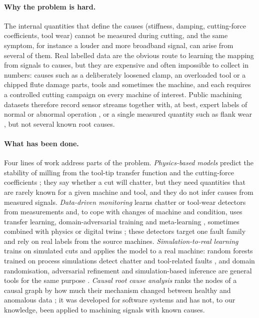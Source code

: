 \documentclass[11pt]{article}
\begin{document}
\paragraph{Why the problem is hard.}
The internal quantities that define the causes (stiffness, damping, cutting-force coefficients, tool wear) cannot be measured during cutting, and the same symptom, for instance a louder and more broadband signal, can arise from several of them.
Real labelled data are the obvious route to learning the mapping from signals to causes, but they are expensive and often impossible to collect in numbers: causes such as a deliberately loosened clamp, an overloaded tool or a chipped flute damage parts, tools and sometimes the machine, and each requires a controlled cutting campaign on every machine of interest.
Public machining datasets therefore record sensor streams together with, at best, expert labels of normal or abnormal operation \citep{kim2026msm}, or a single measured quantity such as flank wear \citep{denkena2023luh}, but not several known root causes.

\paragraph{What has been done.}
Four lines of work address parts of the problem.
\emph{Physics-based models} predict the stability of milling from the tool-tip transfer function and the cutting-force coefficients \citep{altintas2020}; they say whether a cut will chatter, but they need quantities that are rarely known for a given machine and tool, and they do not infer causes from measured signals.
\emph{Data-driven monitoring} learns chatter or tool-wear detectors from measurements and, to cope with changes of machine and condition, uses transfer learning, domain-adversarial training and meta-learning \citep{yesilli2022tlchatter,wang2020datwear,li2023metadg}, sometimes combined with physics or digital twins \citep{li2025physguided,yang2022hybridwear,han2025dtmech}; these detectors target one fault family and rely on real labels from the source machines.
\emph{Simulation-to-real learning} trains on simulated cuts and applies the model to a real machine: random forests trained on process simulations detect chatter \citep{alberts2024sim2real} and tool-related faults \citep{ebrahimi2023smartfaults}, and domain randomisation, adversarial refinement and simulation-based inference are general tools for the same purpose \citep{tobin2017,shrivastava2017,cranmer2020}.
\emph{Causal root cause analysis} ranks the nodes of a causal graph by how much their mechanism changed between healthy and anomalous data \citep{ikram2022rcd,ikram2025rcg,pham2024baro,orchard2025,fang2025simplerca,lee2026brcd}; it was developed for software systems and has not, to our knowledge, been applied to machining signals with known causes.
\end{document}
